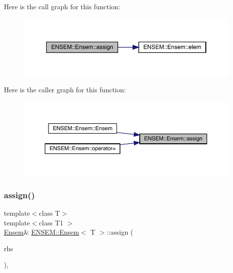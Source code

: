 Here is the call graph for this function\+:
\nopagebreak
\begin{figure}[H]
\begin{center}
\leavevmode
\includegraphics[width=350pt]{d7/d3e/classENSEM_1_1Ensem_aa09448269bc5b72687905254739bf69a_cgraph}
\end{center}
\end{figure}
Here is the caller graph for this function\+:\nopagebreak
\begin{figure}[H]
\begin{center}
\leavevmode
\includegraphics[width=350pt]{d7/d3e/classENSEM_1_1Ensem_aa09448269bc5b72687905254739bf69a_icgraph}
\end{center}
\end{figure}
\mbox{\label{classENSEM_1_1Ensem_aa09448269bc5b72687905254739bf69a}} 
\subsubsection{\texorpdfstring{assign()}{assign()}\hspace{0.1cm}{\footnotesize\ttfamily [2/8]}}
{\footnotesize\ttfamily template$<$class T$>$ \\
template$<$class T1 $>$ \\
\mbox{\hyperlink{classENSEM_1_1Ensem}{Ensem}}\& \mbox{\hyperlink{classENSEM_1_1Ensem}{E\+N\+S\+E\+M\+::\+Ensem}}$<$ T $>$\+::assign (\begin{DoxyParamCaption}\item[{const \mbox{\hyperlink{classENSEM_1_1EScalar}{E\+Scalar}}$<$ T1 $>$ \&}]{rhs }\end{DoxyParamCaption})\hspace{0.3cm}{\ttfamily [inline]}, {\ttfamily [protected]}}



